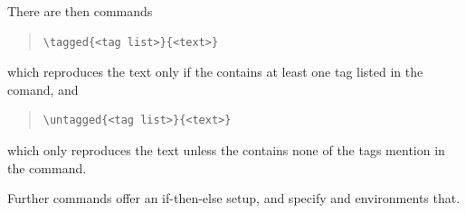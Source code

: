 There are then commands
\begin{quote}
\begin{verbatim}
\tagged{<tag list>}{<text>}
\end{verbatim}
\end{quote}
which reproduces the text only if the  contains at
least one tag listed in the  comand, and
\begin{quote}
\begin{verbatim}
\untagged{<tag list>}{<text>}
\end{verbatim}
\end{quote}
which only reproduces the text unless the  contains
none of the tags mention in the  command.

Further commands offer an if-then-else setup, and specify
 and  environments
that.

